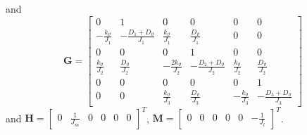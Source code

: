 \documentclass[12pt,a4paper]{scrartcl}
\begin{document}
\begin{onehalfspace}
and 
\begin{equation}
	{\mathbf{G}} = 
	\left[ \begin{matrix}
		0&1&0&0&0&0\\[6pt]
		-\frac{k_{\vartheta}}{J_1} & -\frac{D_1+D_{\vartheta}}{J_1} & \frac{k_{\vartheta}}{J_1} & \frac{D_{\vartheta}}{J_1} & 0 & 0 \\[6pt]
		0&0&0&1&0&0\\[6pt]
		\frac{k_{\vartheta}}{J_2} & \frac{D_{\vartheta}}{J_2} & -\frac{2k_{\vartheta}}{J_2} & -\frac{D_2+D_{\vartheta}}{J_2} & \frac{k_{\vartheta}}{J_2} & \frac{D_{\vartheta}}{J_2} \\[6pt]
		0&0&0&0&0&1\\[6pt]
		0 & 0 & \frac{k_{\vartheta}}{J_3} & \frac{D_{\vartheta}}{J_3} & -\frac{k_{\vartheta}}{J_3} & -\frac{D_3+D_{\vartheta}}{J_3}
	\end{matrix}\right]
\end{equation}
and ${\mathbf{H}} =\left[ \begin{matrix}
	0&\frac{1}{J_m}&0&0&0&0
\end{matrix}\right]^T$, 
${\mathbf{M}} =\left[ \begin{matrix}
	0&0&0&0&0&-\frac{1}{J_l}
\end{matrix}\right]^T$.


\end{onehalfspace}
\end{document}
